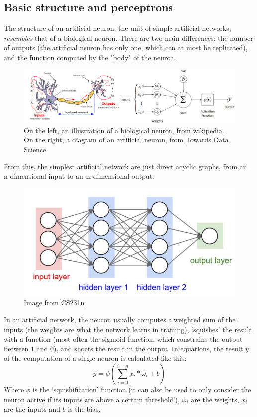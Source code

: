 \documentclass[../main.tex]{subfiles}
\begin{document}
\subsection{Basic structure and perceptrons} The structure of an artificial neuron, the unit of simple artificial networks,    \textit{resembles} that of a biological neuron. There are two main differences: the number of outputs (the artificial neuron has only one, which can at most be replicated), and the function computed by the "body" of the neuron.
\begin{figure}[h]
    \caption{On the left, an illustration of a biological neuron, from \href{https://en.wikipedia.org/wiki/Artificial_neuron}{wikipedia}.
        On the right, a diagram of an artificial neuron, from \href{https://towardsdatascience.com/deep-learning-versus-biological-neurons-floating-point-numbers-spikes-and-neurotransmitters-6eebfa3390e9}{Towards Data Science}}
    \includegraphics[width=\textwidth]{img/neuron_collage.png}
\end{figure}
From this, the simplest artificial network are just direct acyclic graphs, from an n-dimensional input to an m-dimensional output.
\begin{figure}[h]
    \caption{Image from \href{https://cs231n.github.io/convolutional-networks/}{CS231n}}
    \includegraphics[width=\textwidth]{img/ANN.png}
\end{figure}
In an artificial network, the neuron usually computes a weighted sum of the inputs (the weights are what the network learns in training), `squishes' the result with a function (most often the sigmoid function, which constrains the output between 1 and 0), and shoots the result in the output. In equations, the result $y$ of the computation of a single neuron is calculated like this:
\begin{equation}
    y= \phi(\sum_{i=0}^{i=n}{x_i * \omega_i + b})
\end{equation}
Where $\phi$ is the `squishification' function (it can also be used to only consider the neuron active if its inputs are above a certain threshold!), $\omega_i$ are the weights, $x_i$ are the inputs and $b$ is the bias.
\end{document}
